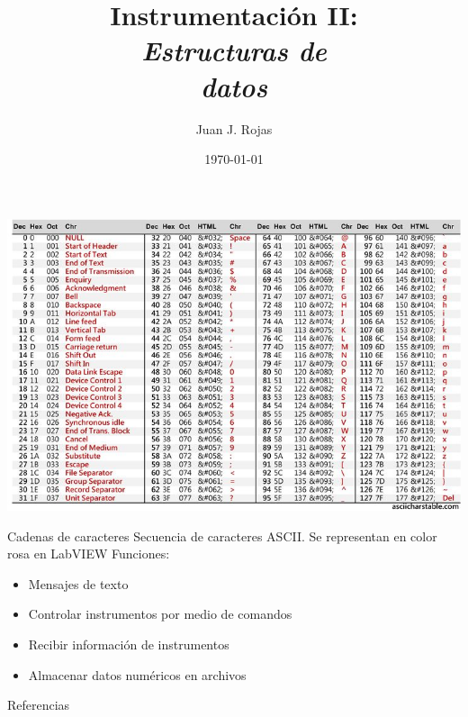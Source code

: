 \documentclass[aspectratio=169]{beamer}
\title{Instrumentación II: \\ \emph{Estructuras de}\\ \emph{datos}}
\author{Juan J. Rojas}
\institute{Instituto Tecnológico de Costa Rica}
\date{\today}
\begin{document}

\maketitle

\newcommand{\blackandwhite}{white} %

\begin{frame}{}
\begin{center}
    \includegraphics[width=0.93\linewidth]{fig/ASCII.jpg}
\end{center}

\end{frame}

\begin{frame}{Cadenas de caracteres}
Secuencia de caracteres ASCII. Se representan en color rosa en LabVIEW
Funciones: 
\begin{itemize}
    \item Mensajes de texto
    \item Controlar instrumentos por medio de comandos
    \item Recibir información de instrumentos
    \item Almacenar datos numéricos en archivos
\end{itemize}
\end{frame}


\begin{frame}{Referencias}


\footnotesize


\end{frame}
\end{document}

